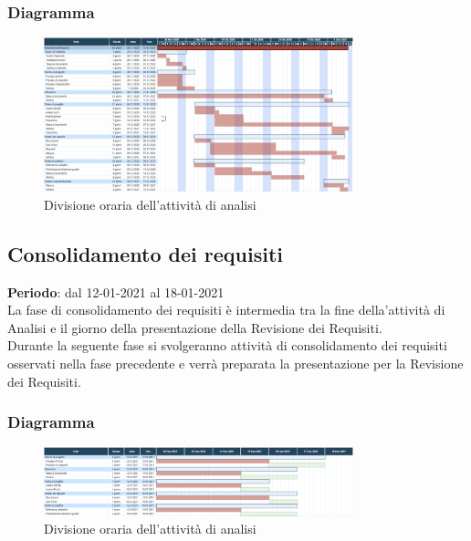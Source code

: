 	\subsubsection{Diagramma}
		\begin{figure}[H]
        		\centering
        		\includegraphics[width=0.8\textwidth]{source/img/analisiattivita.jpg}
        		\caption{Divisione oraria dell'attività di analisi}
    		\end{figure}

	\subsection{Consolidamento dei requisiti}
	\textbf{Periodo}: dal 12-01-2021 al 18-01-2021 \\
	La fase di consolidamento dei requisiti è intermedia tra la fine della'attività di Analisi e il giorno della presentazione della Revisione dei Requisiti. \\
	Durante la seguente fase si svolgeranno attività di consolidamento dei requisiti osservati nella fase precedente e verrà preparata la presentazione per la Revisione dei Requisiti.
	
	\subsubsection{Diagramma}
		\begin{figure}[H]
        		\centering
        		\includegraphics[width=0.8\textwidth]{source/img/Consolidamento_Requisiti.png}
        		\caption{Divisione oraria dell'attività di analisi}
    		\end{figure}
	
